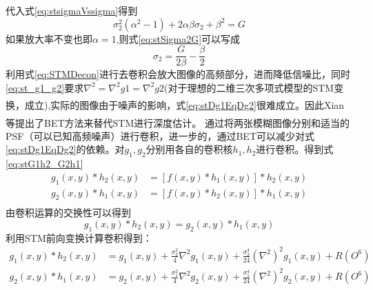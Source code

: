 \documentclass[UTF8]{ctexart}
\newcommand{\myciteup}[1]{\textsuperscript{\textsuperscript{\cite{#1}}}}
\begin{document}
\begin{sloppypar}
\begin{equation}
            \label{eq:stG}
        \end{equation}
        代入式\eqref{eq:stsigmaVssigma}得到
        \begin{equation}
            \sigma_2^2(\alpha^2-1)+2\alpha\beta\sigma_2+\beta^2 = G
            \label{eq:stSigma2G}
        \end{equation}
        如果放大率不变也即$\alpha=1$,则式\eqref{eq:stSigma2G}可以写成
        \begin{equation}
            \sigma_2 = \frac{G}{2\beta} - \frac{\beta}{2}
            \label{eq:stSigma2G_2}
        \end{equation}
        利用式\eqref{eq:STMDecon}进行去卷积会放大图像的高频部分，进而降低信噪比，同时\eqref{eq:st_g1_g2}要求$\nabla^{2} = \nabla^{2}g1=\nabla^2 g2$(对于理想的二维三次多项式模型的STM变换，成立\myciteup{subbarao1991spatial}),实际的图像由于噪声的影响，式\eqref{eq:stDg1EqDg2}很难成立。因此Xian等提出了BET方法来替代STM进行深度估计\myciteup{2006Depth}。
        通过将两张模糊图像分别和适当的PSF（可以已知高频噪声）进行卷积，进一步的，通过BET可以减少对式\eqref{eq:stDg1EqDg2}的依赖。对$g_1,g_2$分别用各自的卷积核$h_1,h_2$进行卷积。得到式\eqref{eq:stG1h2_G2h1}
        \begin{equation}
            \begin{array}{cc}
                g_1(x,y) \ast h_2(x,y) &= \left[ f(x,y) \ast h_1(x,y) \right]\ast h_2(x,y)\\
                g_2(x,y) \ast h_1(x,y) &= \left[ f(x,y) \ast h_2(x,y) \right]\ast h_1(x,y)\\
            \end{array}
            \label{eq:stG1h2_G2h1}
        \end{equation}
        由卷积运算的交换性可以得到
        \begin{equation}
            g_1(x,y)\ast h_2(x,y) = g_2(x,y) \ast h_1(x,y)
            \label{eq:stG1h2EqG2h1}
        \end{equation}
        利用STM前向变换计算卷积得到：
        \begin{equation}
            \begin{array}{cc}
                g_1(x,y)\ast h_2(x,y) &= g_1(x,y) + \frac{\sigma_2 ^2}{4}\nabla^2 g_1(x,y) + \frac{\sigma_2 ^4}{24}(\nabla ^2)^{2}g_1(x,y) +R(O^6)\\
                g_2(x,y)\ast h_1(x,y) &= g_2(x,y) + \frac{\sigma_1 ^2}{4}\nabla^2 g_2(x,y) + \frac{\sigma_1 ^4}{24}(\nabla ^2)^{2}g_2(x,y) +R(O^6)\\
            \end{array}

\end{equation}
\end{sloppypar}
\end{document}
